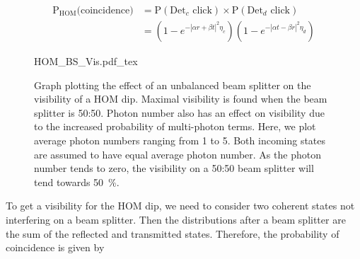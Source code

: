 \begin{align}
	\text{P}_\text{HOM}\text{(coincidence)} &= \text{P}(\text{Det}_c \text{ click}) \times \text{P}(\text{Det}_d \text{ click})\\
	&= \left(1 - e^{-|\alpha r + \beta t|^2 \eta_c}\right)\left(1 - e^{-|\alpha t - \beta r|^2 \eta_d}\right)
\end{align}



\begin{figure}[t]
	\centering
	\small
	\def\svgwidth{0.8\textwidth} 
	{HOM_BS_Vis.pdf_tex}
	\caption[Coherent state photon number visibility against beam splitter ratio]{Graph plotting the effect of an unbalanced beam splitter on the visibility of a HOM dip. Maximal visibility is found when the beam splitter is 50:50. Photon number also has an effect on visibility due to the increased probability of multi-photon terms. Here, we plot average photon numbers ranging from 1 to 5. Both incoming states are assumed to have equal average photon number. As the photon number tends to zero, the visibility on a 50:50 beam splitter will tend towards \SI{50}{\percent}.}
	\label{fig:HOM_BS_Vis}
\end{figure}

To get a visibility for the HOM dip, we need to consider two coherent states not interfering on a beam splitter. Then the distributions after a beam splitter are the sum of the reflected and transmitted states. Therefore, the probability of coincidence is given by

